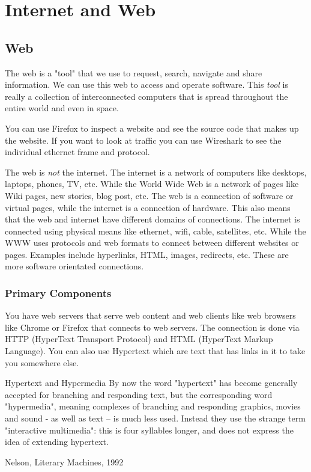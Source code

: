 \documentclass[../CMPUT-404-Notes.tex]{subfiles}
\begin{document}
\chapter{Internet and Web}
\section{Web}
The web is a "tool" that we use to request, search, navigate and share information. We can use this web to access and operate software.
This \emph{tool} is really a collection of interconnected computers that is spread throughout the entire world and even in space. 

You can use Firefox to inspect a website and see the source code that makes up the website.
If you want to look at traffic you can use Wireshark to see the individual ethernet frame and protocol.

The web is \emph{not} the internet. The internet is a network of computers like desktops, laptops, phones, TV, etc. 
While the World Wide Web is a network of pages like Wiki pages, new stories, blog post, etc.
The web is a connection of software or virtual pages, while the internet is a connection of hardware. 
This also means that the web and internet have different domains of connections.
The internet is connected using physical means like ethernet, wifi, cable, satellites, etc.
While the WWW uses protocols and web formats to connect between different websites or pages. Examples include hyperlinks, HTML, images, redirects, etc.
These are more software orientated connections.

\subsection{Primary Components}
You have web servers that serve web content and web clients like web browsers like Chrome or Firefox that connects to web servers.
The connection is done via HTTP (HyperText Transport Protocol) and HTML (HyperText Markup Language). You can also use Hypertext which are text that has links in it to take you somewhere else.

\begin{Definition}
  {Hypertext and Hypermedia}
  By now the word "hypertext" has become generally accepted for branching and responding text, but the corresponding word "hypermedia", meaning complexes of branching and responding graphics, movies and sound - as well as text – is much less used. Instead they use the strange term "interactive multimedia": this is four syllables longer, and does not express the idea of extending hypertext.

  Nelson, Literary Machines, 1992 
\end{Definition}
\end{document}
